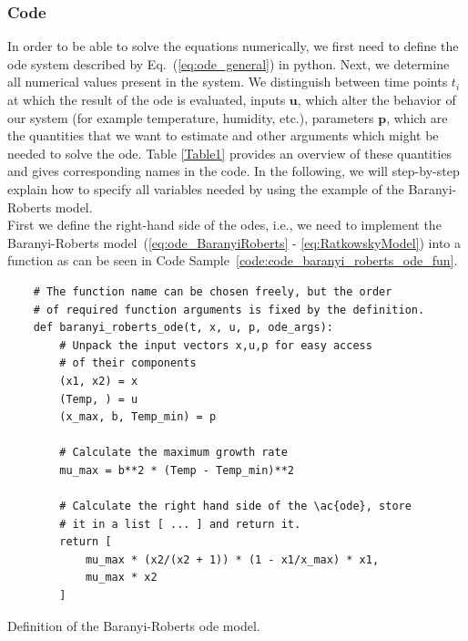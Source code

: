 \documentclass[graybox]{svmult}
\newcommand{\mbu}{\mathbf{u}}
\newcommand{\mbp}{\mathbf{p}}
\begin{document}
\subsubsection{Code}
In order to be able to solve the equations numerically, we first need to define the \ac{ode} system described by Eq.~(\ref{eq:ode_general}) in python.
Next, we determine all numerical values present in the system.
We distinguish between time points $t_i$ at which the result of the \ac{ode} is evaluated, inputs $\mbu$, which alter the behavior of our system (for example temperature, humidity, etc.), parameters $\mbp$, which are the quantities that we want to estimate and other arguments which might be needed to solve the \ac{ode}.
Table \ref{Table1} provides an overview of these quantities and gives corresponding names in the code.
In the following, we will step-by-step explain how to specify all variables needed by using the example of the Baranyi-Roberts model.\\
%
First we define the right-hand side of the \acp{ode}, i.e., we need to implement the Baranyi-Roberts model~(\ref{eq:ode_BaranyiRoberts} - \ref{eq:RatkowskyModel}) into a function as can be seen in Code Sample~\ref{code:code_baranyi_roberts_ode_fun}.
\begin{code}[h]
    \begin{verbatim}
    # The function name can be chosen freely, but the order
    # of required function arguments is fixed by the definition.
    def baranyi_roberts_ode(t, x, u, p, ode_args):
        # Unpack the input vectors x,u,p for easy access
        # of their components
        (x1, x2) = x
        (Temp, ) = u
        (x_max, b, Temp_min) = p

        # Calculate the maximum growth rate
        mu_max = b**2 * (Temp - Temp_min)**2

        # Calculate the right hand side of the \ac{ode}, store
        # it in a list [ ... ] and return it.
        return [
            mu_max * (x2/(x2 + 1)) * (1 - x1/x_max) * x1,
            mu_max * x2
        ]
    \end{verbatim}
    \caption{
        Definition of the Baranyi-Roberts \ac{ode} model.
    }
    \label{code:code_baranyi_roberts_ode_fun}
\end{code}
%
\end{document}
